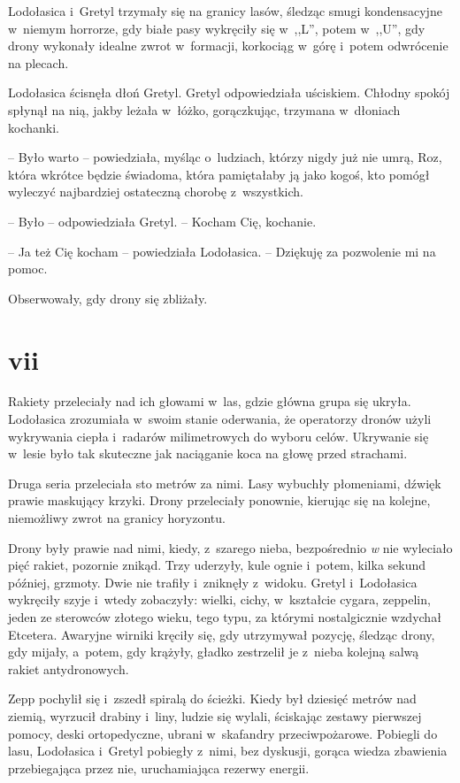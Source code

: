 \documentclass[oneside,polish,11pt,sfheadings]{mwbk}
\begin{document}
Lodołasica i~Gretyl trzymały się na granicy lasów, śledząc smugi
kondensacyjne w~niemym horrorze, gdy białe pasy wykręciły się w~,,L'',
potem w~,,U'', gdy drony wykonały idealne zwrot w~formacji, korkociąg w~górę i~potem odwrócenie na plecach.

Lodołasica ścisnęła dłoń Gretyl. Gretyl odpowiedziała uściskiem. Chłodny
spokój spłynął na nią, jakby leżała w~łóżko, gorączkując, trzymana w~dłoniach kochanki.

-- Było warto -- powiedziała, myśląc o~ludziach, którzy nigdy już nie
umrą, Roz, która wkrótce będzie świadoma, która pamiętałaby ją jako
kogoś, kto pomógł wyleczyć najbardziej ostateczną chorobę z~wszystkich.

-- Było -- odpowiedziała Gretyl. -- Kocham Cię, kochanie.

-- Ja też Cię kocham -- powiedziała Lodołasica. -- Dziękuję za pozwolenie
mi na pomoc.

Obserwowały, gdy drony się zbliżały.

\chapter*{vii}

Rakiety przeleciały nad ich głowami w~las, gdzie główna grupa się
ukryła. Lodołasica zrozumiała w~swoim stanie oderwania, że operatorzy
dronów użyli wykrywania ciepła i~radarów milimetrowych do wyboru celów.
Ukrywanie się w~lesie było tak skuteczne jak naciąganie koca na głowę
przed strachami.

Druga seria przeleciała sto metrów za nimi. Lasy wybuchły płomeniami,
dźwięk prawie maskujący krzyki. Drony przeleciały ponownie, kierując się
na kolejne, niemożliwy zwrot na granicy horyzontu.

Drony były prawie nad nimi, kiedy, z~szarego nieba, bezpośrednio
\textit{w} nie wyleciało pięć rakiet, pozornie znikąd. Trzy uderzyły, kule
ognie i~potem, kilka sekund później, grzmoty. Dwie nie trafiły i~zniknęły z~widoku. Gretyl i~Lodołasica wykręciły szyje i~wtedy
zobaczyły: wielki, cichy, w~kształcie cygara, zeppelin, jeden ze
sterowców złotego wieku, tego typu, za którymi nostalgicznie wzdychał
Etcetera. Awaryjne wirniki kręciły się, gdy utrzymywał pozycję, śledząc
drony, gdy mijały, a~potem, gdy krążyły, gładko zestrzelił je z~nieba
kolejną salwą rakiet antydronowych.

Zepp pochylił się i~zszedł spiralą do ścieżki. Kiedy był dziesięć metrów
nad ziemią, wyrzucił drabiny i~liny, ludzie się wylali, ściskając
zestawy pierwszej pomocy, deski ortopedyczne, ubrani w~skafandry
przeciwpożarowe. Pobiegli do lasu, Lodołasica i~Gretyl pobiegły z~nimi,
bez dyskusji, gorąca wiedza zbawienia przebiegająca przez nie,
uruchamiająca rezerwy energii.
\end{document}
